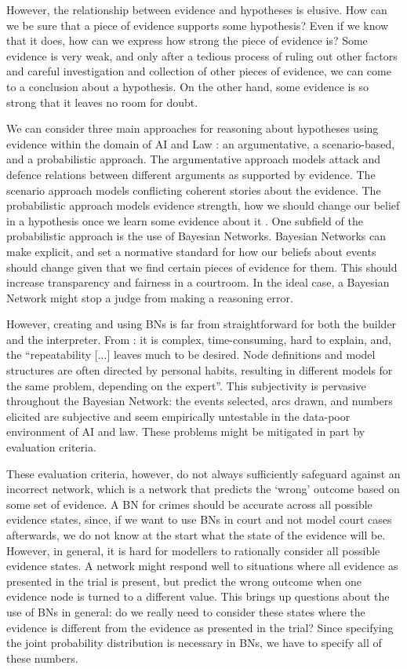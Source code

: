 \documentclass[12pt]{article}
\begin{document}
However, the relationship between evidence and hypotheses is elusive. How can we be sure that a piece of evidence supports some hypothesis? Even if we know that it does, how can we express how strong the piece of evidence is? Some evidence is very weak, and only after a tedious process of ruling out other factors and careful investigation and collection of other pieces of evidence, we can come to a conclusion about a hypothesis. On the other hand, some evidence is so strong that it leaves no room for doubt.

We can consider three main approaches for reasoning about hypotheses using evidence within the domain of AI and Law \citep{diBelloVerheij2018}: an argumentative, a scenario-based, and a probabilistic approach. The argumentative approach models attack and defence relations between different arguments as supported by evidence. The scenario approach models conflicting coherent stories about the evidence. The probabilistic approach models evidence strength, how we should change our belief in a hypothesis once we learn some evidence about it \citep{diBelloVerheij2018}.  One subfield of the probabilistic approach is the use of Bayesian Networks. Bayesian Networks can make explicit, and set a normative standard for how our beliefs about events should change given that we find certain pieces of evidence for them. This should increase transparency and fairness in a courtroom. In the ideal case, a Bayesian Network might stop a judge from making a reasoning error.

However, creating and using BNs is far from straightforward for both the builder and the interpreter. From \citet{deKoeijer2020}: it is complex, time-consuming, hard to explain, and, the ``repeatability [...] leaves much to be desired. Node definitions and model structures are often directed by personal habits, resulting in different models for the same problem, depending on the expert''. This subjectivity is pervasive throughout the Bayesian Network: the events selected, arcs drawn, and numbers elicited are subjective and seem empirically untestable in the data-poor environment of AI and law. These problems might be mitigated in part by evaluation criteria. 

These evaluation criteria, however, do not always sufficiently safeguard against an incorrect network, which is a network that predicts the `wrong' outcome based on some set of evidence. A BN for crimes should be accurate across all possible evidence states, since, if we want to use BNs in court and not model court cases afterwards, we do not know at the start what the state of the evidence will be. However, in general, it is hard for modellers to rationally consider all possible evidence states. A network might respond well to situations where all evidence as presented in the trial is present, but predict the wrong outcome when one evidence node is turned to a different value. This brings up questions about the use of BNs in general: do we really need to consider these states where the evidence is different from the evidence as presented in the trial? Since specifying the joint probability distribution is necessary in BNs, we have to specify all of these numbers. 
\end{document}
